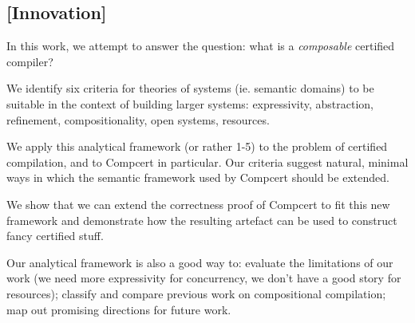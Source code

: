 \subsection{[Innovation]}

In this work, we attempt to answer the question:
what is a \emph{composable} certified compiler?

We identify six criteria for theories of systems (ie. semantic domains)
to be suitable in the context of building larger systems:
expressivity, abstraction, refinement,
compositionality, open systems, resources.

We apply this analytical framework (or rather 1-5)
to the problem of certified compilation,
and to Compcert in particular.
Our criteria suggest natural,
minimal ways in which the semantic framework
used by Compcert should be extended.

We show that we can extend the correctness proof of Compcert
to fit this new framework and
demonstrate how the resulting artefact
can be used to construct fancy certified stuff.

Our analytical framework is also a good way to:
evaluate the limitations of our work
(we need more expressivity for concurrency,
we don't have a good story for resources);
classify and compare previous work on compositional compilation;
map out promising directions for future work.

